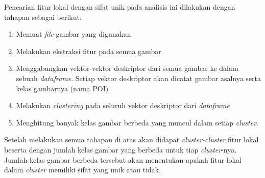 Pencarian fitur lokal dengan sifat unik pada analisis ini dilakukan dengan tahapan sebagai berikut:
\begin{enumerate}
	\item Memuat \textit{file} gambar yang digunakan
	\item Melakukan ekstraksi fitur pada semua gambar
	\item Menggabungkan vektor-vektor deskriptor dari semua gambar ke dalam sebuah \textit{dataframe}. Setiap vektor deskriptor akan dicatat gambar asalnya serta kelas gambarnya (nama POI)
	\item Melakukan \textit{clustering} pada seluruh vektor deskriptor dari \textit{dataframe}
	\item Menghitung banyak kelas gambar berbeda yang muncul dalam setiap \textit{cluster}.
\end{enumerate}
Setelah melakukan semua tahapan di atas akan didapat \textit{cluster-cluster} fitur lokal beserta dengan jumlah kelas gambar yang berbeda untuk tiap \textit{cluster}-nya. Jumlah kelas gambar berbeda tersebut akan menentukan apakah fitur lokal dalam \textit{cluster} memiliki sifat yang unik atau tidak. 

